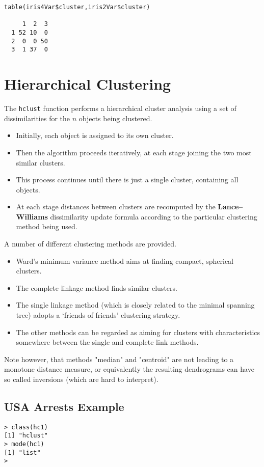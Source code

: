 \documentclass[11pt]{article} %
\begin{document}
\begin{verbatim}
table(iris4Var$cluster,iris2Var$cluster)
   
     1  2  3
  1 52 10  0
  2  0  0 50
  3  1 37  0
\end{verbatim}


\section{Hierarchical Clustering}
The \texttt{hclust} function performs a hierarchical cluster analysis using a set of dissimilarities for the $n$ objects being clustered.

\begin{itemize} 
\item Initially, each object is assigned to its own cluster.
\item Then the algorithm proceeds iteratively, at each stage joining the two most similar clusters. \item This process continues until there is just a single cluster, containing all objects. 
\item At each stage distances between clusters are recomputed by the \textbf{Lance–Williams} dissimilarity update formula according to the particular clustering method being used.
\end{itemize}

A number of different clustering methods are provided. 

\begin{itemize}
\item Ward's minimum variance method aims at finding compact, spherical clusters. 
\item The complete linkage method finds similar clusters. 
\item The single linkage method (which is closely related to the minimal spanning tree) adopts a ‘friends of friends’ clustering strategy. 
\item The other methods can be regarded as aiming for clusters with characteristics somewhere between the single and complete link methods. 
\end{itemize}
Note however, that methods "median" and "centroid" are not leading to a monotone distance measure, or equivalently the resulting dendrograms can have so called inversions (which are hard to interpret).

\subsection{USA Arrests Example}
\begin{verbatim}
> class(hc1)
[1] "hclust"
> mode(hc1)
[1] "list"
> 
\end{verbatim}
\end{document}
